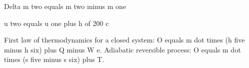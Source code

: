 Delta m two equals m two minus m one

u two equals u one plus h of 200 c

First law of thermodynamics for a closed system:  
O equals m dot times (h five minus h six) plus Q minus W e.  
Adiabatic reversible process:  
O equals m dot times (s five minus s six) plus T.